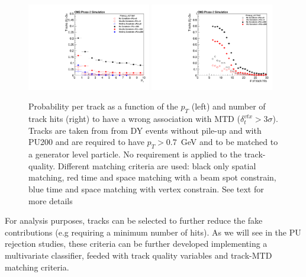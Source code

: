 \begin{figure}[!hbtp]
\centering
\includegraphics[width=0.48\textwidth]{fig/performance/fakes_vs_pt_fullComp.pdf}
\includegraphics[width=0.48\textwidth]{fig/performance/fakes_vs_nHits.pdf}
\caption{Probability per track as a function of the $p_{T}$ (left) and number of track hits (right) to have a wrong association with MTD ($\delta_{t}^{vtx}>3\sigma$). Tracks are taken from  from DY events without pile-up and with PU200 and are required to have $p_{T}>0.7$~GeV and to be matched to a generator level particle. No requirement is applied to the track-quality. Different matching criteria are used: black only spatial matching, red time and space matching with a beam spot constrain, blue time and space matching with vertex constrain. See text for more details}
\label{fig:fakes_pt_nhits}
\end{figure}

For analysis purposes, tracks can be selected to further reduce the fake contributions (e.g requiring a minimum number of hits). As we will see in the PU rejection studies, these criteria can be further developed implementing a multivariate classifier, feeded with track quality variables and track-MTD matching criteria.

